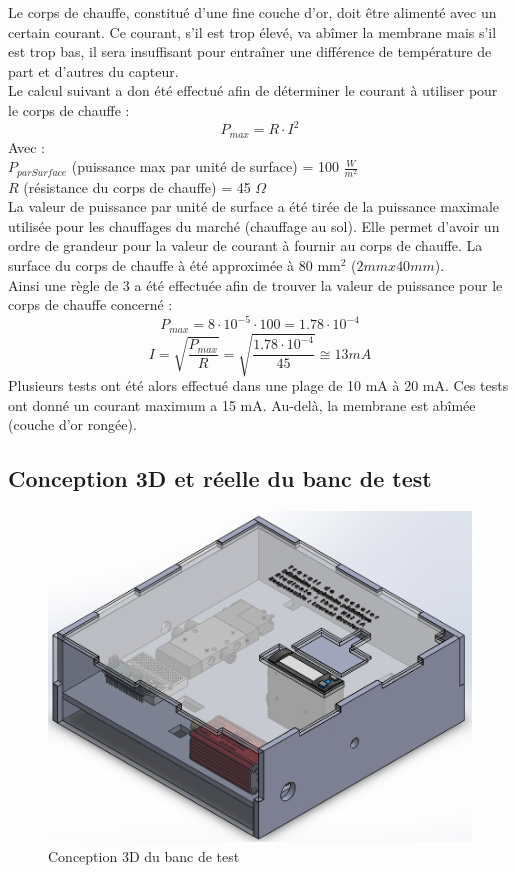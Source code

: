 Le corps de chauffe, constitué d'une fine couche d'or, doit être alimenté avec un certain courant. Ce courant, s'il est trop élevé, va abîmer la
membrane mais s'il est trop bas, il sera insuffisant pour entraîner une différence de température de part et d'autres du capteur. \\

Le calcul suivant a don été effectué afin de déterminer le courant à utiliser pour le corps de chauffe :
\[P_{max} = R\cdot I^2\]
Avec :\\
$P_{parSurface}$ (puissance max par unité de surface) = 100 $\frac{W}{m^2}$\\
$R$ (résistance du corps de chauffe) = 45 $\Omega$\\

La valeur de puissance par unité de surface a été tirée de la puissance maximale utilisée pour les chauffages du marché (chauffage au sol).
Elle permet d'avoir un ordre de grandeur pour la valeur de courant à fournir au corps de chauffe.
La surface du corps de chauffe à été approximée à 80 mm$^2$ ($2mm x 40mm$).\\
Ainsi une règle de 3 a été effectuée afin de trouver la valeur de puissance pour le corps de chauffe concerné :
\[P_{max} = 8\cdot 10^{-5}\cdot 100 = 1.78\cdot 10^{-4}\]
\[I = \sqrt{\frac{P_{max}}{R}} = \sqrt{\frac{1.78\cdot 10^{-4}}{45}} \cong 13 mA\]
Plusieurs tests ont été alors effectué dans une plage de 10 mA à 20 mA. Ces tests ont donné un courant maximum a 15 mA. Au-delà, la membrane
est abîmée (couche d'or rongée).\\

\subsection{Conception 3D et réelle du banc de test}
\begin{figure}[H]
    \centering
    \includegraphics[scale = 0.5]{assets/figures/Banc_de_test.png}
    \caption{Conception 3D du banc de test}
    \label{fig:3D_banc_test}
\end{figure}

